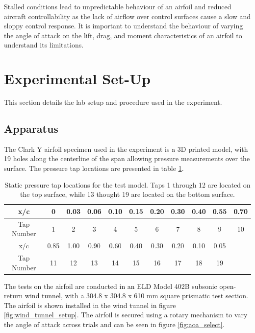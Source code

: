 \documentclass[runningheads]{llncs}
\begin{document}
\noindent
Stalled conditions lead to unpredictable behaviour of an airfoil and reduced aircraft controllability as the lack of airflow over control surfaces cause a slow and sloppy control response. It is important to understand the behaviour of varying the angle of attack on the lift, drag, and moment characteristics of an airfoil to understand its limitations.




\section{Experimental Set-Up}

\noindent
This section details the lab setup and procedure used in the experiment.

\subsection{Apparatus}

\noindent
The Clark Y airfoil specimen used in the experiment is a 3D printed model, with 19 holes along the centerline of the span allowing pressure measurements over the surface. The pressure tap locations are presented in table \ref{tab:pressure_taps}.\newline

\begin{table}
    \centering
    \begin{tabular}{|c||c|c|c|c|c|c|c|c|c|c|}\hline
        x/c & 0 & 0.03 & 0.06 & 0.10 & 0.15 & 0.20 & 0.30 & 0.40 & 0.55 & 0.70 \\\hline
        Tap Number & 1 & 2 & 3 & 4 & 5 & 6 & 7 & 8 & 9 & 10\\\hline \hline
        x/c & 0.85 & 1.00 & 0.90 & 0.60 & 0.40 & 0.30 & 0.20 & 0.10 & 0.05&\\\hline
        Tap Number & 11 & 12 & 13 & 14 & 15 & 16 & 17 & 18 & 19&\\\hline
    \end{tabular}
    \caption{Static pressure tap locations for the test model. Taps 1 through 12 are located on the top surface, while 13 thought 19 are located on the bottom surface.}
    \label{tab:pressure_taps}
\end{table}

\noindent
The tests on the airfoil are conducted in an ELD Model 402B subsonic open-return wind tunnel, with a 304.8 x 304.8 x 610 mm  square prismatic test section. The airfoil is shown installed in the wind tunnel in figure \ref{fig:wind_tunnel_setup}. The airfoil is secured using a rotary mechanism to vary the angle of attack across trials and can be seen in figure \ref{fig:aoa_select}.\newline
\end{document}
